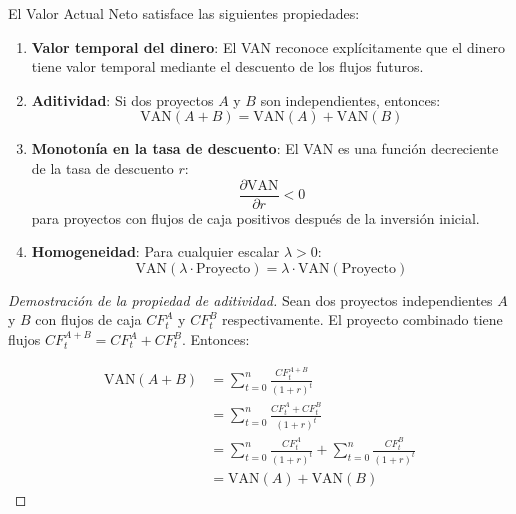 \begin{proposicion}
El Valor Actual Neto satisface las siguientes propiedades:

\begin{enumerate}
\item \textbf{Valor temporal del dinero}: El VAN reconoce explícitamente que el dinero tiene valor temporal mediante el descuento de los flujos futuros.

\item \textbf{Aditividad}: Si dos proyectos $A$ y $B$ son independientes, entonces:
\begin{equation}
\text{VAN}(A + B) = \text{VAN}(A) + \text{VAN}(B)
\end{equation}

\item \textbf{Monotonía en la tasa de descuento}: El VAN es una función decreciente de la tasa de descuento $r$:
\begin{equation}
\frac{\partial \text{VAN}}{\partial r} < 0
\end{equation}
para proyectos con flujos de caja positivos después de la inversión inicial.

\item \textbf{Homogeneidad}: Para cualquier escalar $\lambda > 0$:
\begin{equation}
\text{VAN}(\lambda \cdot \text{Proyecto}) = \lambda \cdot \text{VAN}(\text{Proyecto})
\end{equation}
\end{enumerate}
\end{proposicion}

\begin{proof}[Demostración de la propiedad de aditividad]
Sean dos proyectos independientes $A$ y $B$ con flujos de caja $CF_t^A$ y $CF_t^B$ respectivamente. El proyecto combinado tiene flujos $CF_t^{A+B} = CF_t^A + CF_t^B$. Entonces:

\begin{align*}
\text{VAN}(A + B) &= \sum_{t=0}^{n} \frac{CF_t^{A+B}}{(1+r)^t} \\
&= \sum_{t=0}^{n} \frac{CF_t^A + CF_t^B}{(1+r)^t} \\
&= \sum_{t=0}^{n} \frac{CF_t^A}{(1+r)^t} + \sum_{t=0}^{n} \frac{CF_t^B}{(1+r)^t} \\
&= \text{VAN}(A) + \text{VAN}(B)
\end{align*}
\end{proof}

